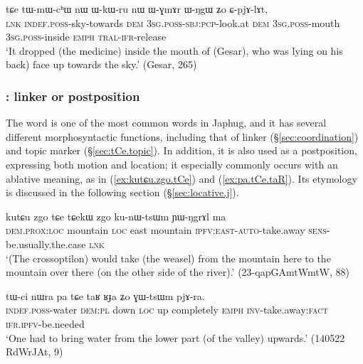 \begin{exe}
\ex \label{ex:tWmWchW} 
\gll tɕe tɯ-mɯ-cʰɯ nɯ ɯ-kɯ-ru nɯ ɯ-ɣmɤr ɯ-ŋgɯ ʑo ɕ-pjɤ-lɤt, \\
\textsc{lnk} \textsc{indef}.\textsc{poss}-sky-towards \textsc{dem} \textsc{3sg}.\textsc{poss}-\textsc{sbj}:\textsc{pcp}-look.at \textsc{dem} \textsc{3sg}.\textsc{poss}-mouth \textsc{3sg}.\textsc{poss}-inside \textsc{emph} \textsc{tral}-\textsc{ifr}-release \\
\glt `It dropped (the medicine) inside the mouth of (Gesar), who was lying on his back) face up towards the sky.' (Gesar, 265)
\end{exe}

\subsubsection{: linker or postposition} \label{sec:tCe.postposition}
The word  is one of the most common words in Japhug, and it has several different morphosyntactic functions, including that of linker (§\ref{sec:coordination}) and topic marker (§\ref{sec:tCe.topic}). In addition, it is also used as a postposition, expressing both motion and location; it especially commonly occurs with an ablative meaning, as in (\ref{ex:kutɕu.zgo.tCe}) and (\ref{ex:pa.tCe.taR}). Its etymology is discussed in the following section (§\ref{sec:locative.j}).

\begin{exe}
\ex \label{ex:kutɕu.zgo.tCe}
\gll kutɕu zgo tɕe tɕekɯ zgo ku-nɯ-tsɯm ɲɯ-ŋgrɤl ma \\
\textsc{dem}.\textsc{prox}:\textsc{loc} mountain \textsc{loc} east mountain \textsc{ipfv}:\textsc{east}-\textsc{auto}-take.away \textsc{sens}-be.usually.the.case \textsc{lnk} \\
\glt `(The crossoptilon) would take (the weasel) from the mountain here to the mountain over there (on the other side of the river).' (23-qapGAmtWmtW, 88)
\end{exe}

\begin{exe}
\ex \label{ex:pa.tCe.taR}
\gll tɯ-ci nɯra pa tɕe taʁ ʁɟa ʑo ɣɯ-tsɯm pjɤ-ra. \\
\textsc{indef}.\textsc{poss}-water \textsc{dem}:\textsc{pl} down \textsc{loc} up completely \textsc{emph} \textsc{inv}-take.away:\textsc{fact} \textsc{ifr}.\textsc{ipfv}-be.needed \\
\glt `One had to bring water from the lower part (of the valley) upwards.' (140522 RdWrJAt, 9)
\end{exe}

